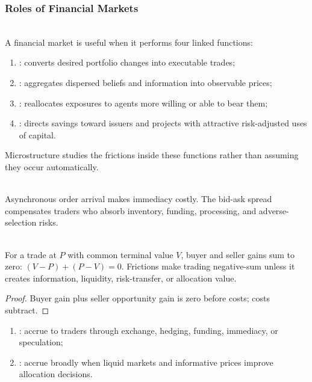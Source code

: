 \subsubsection{Roles of Financial Markets}

\begin{principle} \\
A financial market is useful when it performs four linked functions:
\begin{enumerate}[label=\roman*.]
\setlength{\itemsep}{0pt}
\item {}: converts desired portfolio changes into executable trades;
\item {}: aggregates dispersed beliefs and information into observable prices;
\item {}: reallocates exposures to agents more willing or able to bear them;
\item {}: directs savings toward issuers and projects with attractive risk-adjusted uses of capital.
\end{enumerate}
Microstructure studies the frictions inside these functions rather than assuming they occur automatically.
\end{principle}

\begin{principle} \\
Asynchronous order arrival makes immediacy costly. The bid-ask spread compensates traders who absorb inventory, funding, processing, and adverse-selection risks.
\end{principle}

\begin{proposition} \\
For a trade at $P$ with common terminal value $V$, buyer and seller gains sum to zero: $(V-P)+(P-V)=0$. Frictions make trading negative-sum unless it creates information, liquidity, risk-transfer, or allocation value.
\begin{proof}
Buyer gain plus seller opportunity gain is zero before costs; costs subtract.
\end{proof}
\end{proposition}

\begin{taxonomy} 
\begin{enumerate}[label=\roman*.]
\setlength{\itemsep}{0pt}
\item {}: accrue to traders through exchange, hedging, funding, immediacy, or speculation;
\item {}: accrue broadly when liquid markets and informative prices improve allocation decisions.
\end{enumerate}
\end{taxonomy}

